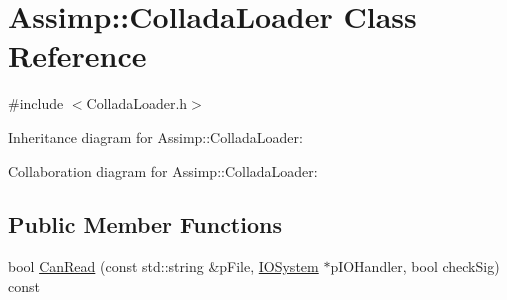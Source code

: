 \hypertarget{class_assimp_1_1_collada_loader}{\section{Assimp\+:\+:Collada\+Loader Class Reference}
\label{class_assimp_1_1_collada_loader}
}


{\ttfamily \#include $<$Collada\+Loader.\+h$>$}



Inheritance diagram for Assimp\+:\+:Collada\+Loader\+:


Collaboration diagram for Assimp\+:\+:Collada\+Loader\+:
\subsection*{Public Member Functions}
\begin{DoxyCompactItemize}
\item 
bool \hyperlink{class_assimp_1_1_collada_loader_a5a6ee3f22d91684412107755ffdfb167}{Can\+Read} (const std\+::string \&p\+File, \hyperlink{class_assimp_1_1_i_o_system}{I\+O\+System} $\ast$p\+I\+O\+Handler, bool check\+Sig) const 
\end{DoxyCompactItemize}
